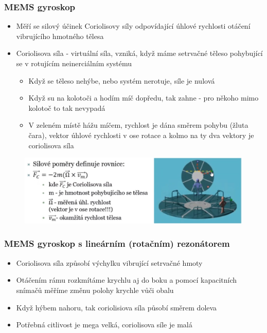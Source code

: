 \subsubsection*{MEMS gyroskop}
\begin{itemize}
    \item Měří se silový účinek Coriolisovy síly odpovídající úhlové rychlosti otáčení vibrujícího hmotného tělesa
    \item Coriolisova síla - virtuální síla, vzniká, když máme setrvačné těleso pohybující se v rotujícím neinerciálním systému \begin{itemize}
              \item Když se těleso nehýbe, nebo systém nerotuje, síle je nulová
              \item Když su na kolotoči a hodím míč dopředu, tak zahne - pro někoho mimo kolotoč to tak nevypadá
              \item V zeleném místě hážu míčem, rychlost je dána směrem pohybu (žluta čara), vektor úhlové rychlosti v ose rotace a kolmo na ty dva vektory je coriolisova síla
          \end{itemize}
\end{itemize}

\begin{figure}[h]
    \centering
    \includegraphics[scale = 0.40]{img/coriolis.png}
\end{figure}

\subsubsection*{MEMS gyroskop s lineárním (rotačním) rezonátorem}
\begin{itemize}
    \item Coriolisova síla způsobí výchylku vibrující setrvačné hmoty
    \item Otáčením rámu rozkmítáme krychlu aj do boku a pomocí kapacitních snímačů měříme změnu polohy krychle vůči obalu
    \item Když hýbem nahoru, tak coriolisiova síla působí směrem doleva
    \item Potřebná citlivost je mega velká, coriolisova síle je malá
\end{itemize}

